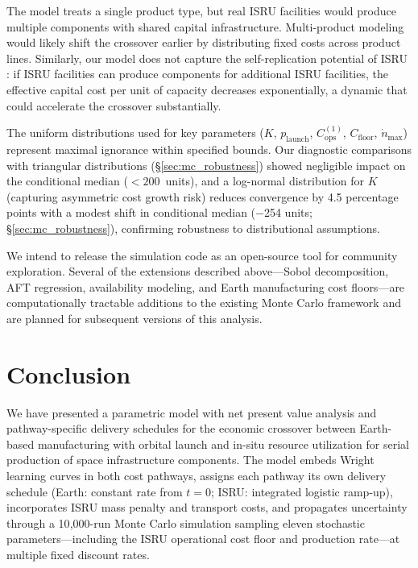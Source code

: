 \documentclass[preprint,12pt]{elsarticle}
\begin{document}
The model treats a single product type, but real ISRU facilities would produce multiple components with shared capital infrastructure. Multi-product modeling would likely shift the crossover earlier by distributing fixed costs across product lines. Similarly, our model does not capture the self-replication potential of ISRU \cite{metzger2013}: if ISRU facilities can produce components for additional ISRU facilities, the effective capital cost per unit of capacity decreases exponentially, a dynamic that could accelerate the crossover substantially.

The uniform distributions used for key parameters ($K$, $p_{\mathrm{launch}}$, $C_{\mathrm{ops}}^{(1)}$, $C_{\mathrm{floor}}$, $\dot{n}_{\max}$) represent maximal ignorance within specified bounds. Our diagnostic comparisons with triangular distributions (\S\ref{sec:mc_robustness}) showed negligible impact on the conditional median ($<200$~units), and a log-normal distribution for $K$ (capturing asymmetric cost growth risk) reduces convergence by 4.5 percentage points with a modest shift in conditional median ($-$254 units; \S\ref{sec:mc_robustness}), confirming robustness to distributional assumptions.

We intend to release the simulation code as an open-source tool for community exploration. Several of the extensions described above---Sobol decomposition, AFT regression, availability modeling, and Earth manufacturing cost floors---are computationally tractable additions to the existing Monte Carlo framework and are planned for subsequent versions of this analysis.

\section{Conclusion}
\label{sec:conclusion}

We have presented a parametric model with net present value analysis and pathway-specific delivery schedules for the economic crossover between Earth-based manufacturing with orbital launch and in-situ resource utilization for serial production of space infrastructure components. The model embeds Wright learning curves in both cost pathways, assigns each pathway its own delivery schedule (Earth: constant rate from $t = 0$; ISRU: integrated logistic ramp-up), incorporates ISRU mass penalty and transport costs, and propagates uncertainty through a 10{,}000-run Monte Carlo simulation sampling eleven stochastic parameters---including the ISRU operational cost floor and production rate---at multiple fixed discount rates.
\end{document}

